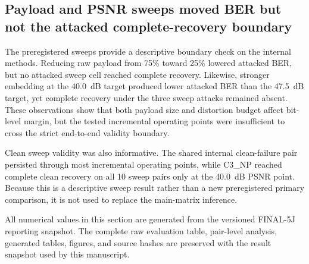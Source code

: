 \subsection{Payload and PSNR sweeps moved BER but not the attacked complete-recovery boundary}



The preregistered sweeps provide a descriptive boundary check on the internal methods. Reducing raw payload from 75\% toward 25\% lowered attacked BER, but no attacked sweep cell reached complete recovery. Likewise, stronger embedding at the 40.0~dB target produced lower attacked BER than the 47.5~dB target, yet complete recovery under the three sweep attacks remained absent. These observations show that both payload size and distortion budget affect bit-level margin, but the tested incremental operating points were insufficient to cross the strict end-to-end validity boundary.

Clean sweep validity was also informative. The shared internal clean-failure pair persisted through most incremental operating points, while C3\_NP reached complete clean recovery on all 10 sweep pairs only at the 40.0~dB PSNR point. Because this is a descriptive sweep result rather than a new preregistered primary comparison, it is not used to replace the main-matrix inference.

All numerical values in this section are generated from the versioned FINAL-5J reporting snapshot. The complete raw evaluation table, pair-level analysis, generated tables, figures, and source hashes are preserved with the result snapshot used by this manuscript.
